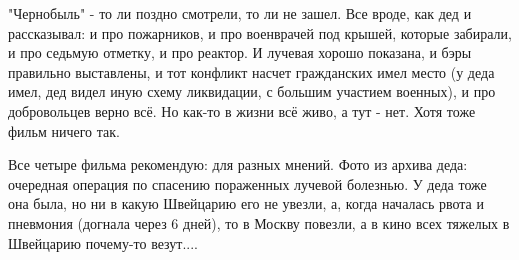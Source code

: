 "Чернобыль" - то ли поздно смотрели, то ли не зашел. Все вроде, как дед и
рассказывал: и про пожарников, и про военврачей под крышей, которые забирали, и
про седьмую отметку, и про реактор. И лучевая хорошо показана, и бэры правильно
выставлены, и тот конфликт насчет гражданских имел место (у деда имел, дед
видел иную схему ликвидации, с большим участием военных), и про добровольцев
верно всё. Но как-то в жизни всё живо, а тут - нет. Хотя тоже фильм ничего так.

Все четыре фильма рекомендую: для разных мнений. Фото из архива деда: очередная
операция по спасению пораженных лучевой болезнью. У деда тоже она была, но ни в
какую Швейцарию его не увезли, а, когда началась рвота и пневмония (догнала
через 6 дней), то в Москву повезли, а в кино всех тяжелых в Швейцарию почему-то
везут....

